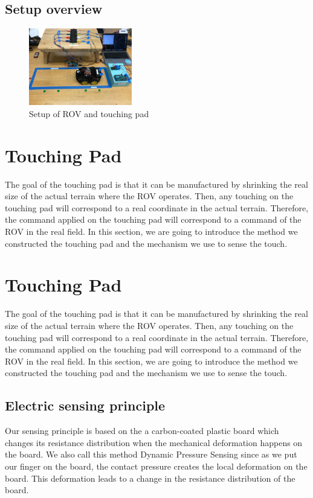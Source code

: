 \documentclass[reprint,amsmath, amsfonts, amssymb, aps, letterpaper]{revtex4-1}
\begin{document}
\subsection{Setup overview}
\begin{figure}[h]
\centering
    \includegraphics[width=0.4\textwidth]{./figure/setup}     
       \caption{Setup of ROV and touching pad }
    \label{fig::setup}
\end{figure}

\section{Touching Pad}
The goal of the touching pad is that it can be manufactured by shrinking the real size of the actual terrain where the ROV operates. Then, any touching on the touching pad will correspond to a real coordinate in the actual terrain. Therefore, the command applied on the touching pad will correspond to a command of the ROV in the real field. In this section, we are going to introduce the method we constructed the touching pad and the mechanism we use to sense the touch.


\section{Touching Pad}
The goal of the touching pad is that it can be manufactured by shrinking the real size of the actual terrain where the ROV operates. Then, any touching on the touching pad will correspond to a real coordinate in the actual terrain. Therefore, the command applied on the touching pad will correspond to a command of the ROV in the real field. In this section, we are going to introduce the method we constructed the touching pad and the mechanism we use to sense the touch.

\subsection{Electric sensing principle}
Our sensing principle is based on the a carbon-coated plastic board which changes its resistance distribution when the mechanical deformation happens on the board. We also call this method Dynamic Pressure Sensing since as we put our finger on the board, the contact pressure creates the local deformation on the board. This deformation leads to a change in the resistance distribution of the board. 
\end{document}
